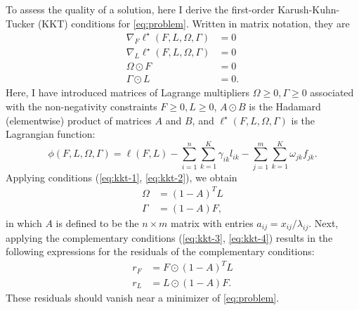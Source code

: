 \documentclass[final]{siamart171218}
\begin{document}
To assess the quality of a solution, here I derive the first-order
Karush-Kuhn-Tucker (KKT) conditions for \eqref{eq:problem}. Written
in matrix notation, they are
\begin{align}
\nabla_F \ell^{\star}(F,L,\Omega,\Gamma) &= 0 \label{eq:kkt-1} \\
\nabla_L \ell^{\star}(F,L,\Omega,\Gamma) &= 0 \label{eq:kkt-2} \\
\Omega \odot F &= 0 \label{eq:kkt-3} \\
\Gamma \odot L &= 0 \label{eq:kkt-4}.
\end{align}
Here, I have introduced matrices of Lagrange multipliers $\Omega \geq
0, \Gamma \geq 0$ associated with the non-negativity constraints $F
\geq 0, L \geq 0$, $A \odot B$ is the Hadamard (elementwise) product
of matrices $A$ and $B$, and $\ell^{\star}(F, L, \Omega, \Gamma)$ is the
Lagrangian function:
\begin{equation}
\phi(F, L, \Omega, \Gamma) = \ell(F,L) 
- \sum_{i=1}^n \sum_{k=1}^K \gamma_{ik} l_{ik}
- \sum_{j=1}^m \sum_{k=1}^K \omega_{jk} f_{jk}.
\end{equation}
Applying conditions (\ref{eq:kkt-1}, \ref{eq:kkt-2}), we obtain
\begin{align}
\Omega &= (1 - A)^TL \\ 
\Gamma &= (1 - A)F,
\end{align}
in which $A$ is defined to be the $n \times m$ matrix with entries
$a_{ij} = x_{ij} / \lambda_{ij}$. Next, applying the complementary
conditions (\ref{eq:kkt-3}, \ref{eq:kkt-4}) results in the following
expressions for the residuals of the complementary conditions:
\begin{align}
r_F &= F \odot (1 - A)^TL \\
r_L &= L \odot (1 - A)F.
\end{align}
These residuals should vanish near a minimizer of \eqref{eq:problem}.



\end{document}
